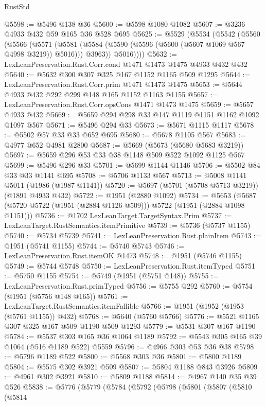\begin{lexlean}{RustStd}
\begin{coremodule}
@5598 := @5496 @138 @36
@5600 := @5598 @1080 @1082
@5607 := @3236 @4933 @432 @59 @165 @36 @528 @695
@5625 := @5529
    (@5534
      (@5542
        (@5560
          (@5566
            (@5571
              (@5581 (@5584 (@5590 (@5596 (@5600 (@5607 @1069 @567 @4998 @3219)) @5016))) @3963))
            @5016))))
@5632 := LexLeanPreservation.Rust.Corr.cond @1471 @1473 @1475 @4933 @432 @432
@5640 := @5632 @300 @307 @325 @167 @1152 @1165 @509 @1295
@5644 := LexLeanPreservation.Rust.Corr.prim @1471 @1473 @1475
@5653 := @5644 @4933 @432 @292 @299 @148 @165 @1152 @1163 @1155
@5657 := LexLeanPreservation.Rust.Corr.opsCons @1471 @1473 @1475
@5659 := @5657 @4933 @432
@5669 := @5659 @294 @298 @33 @147 @1119 @1151 @1162 @1092 @1097 @567
@5671 := @5496 @294 @33
@5673 := @5671 @1115 @1117
@5678 := @5502 @57 @33 @33 @652 @695
@5680 := @5678 @1105 @567
@5683 := @4977 @652 @4981 @2800
@5687 := @5669 (@5673 (@5680 @5683 @3219))
@5697 := @5659 @296 @53 @33 @38 @1148 @509 @522 @1092 @1125 @567
@5699 := @5496 @296 @33
@5701 := @5699 @1144 @1146
@5706 := @5502 @84 @33 @33 @1141 @695
@5708 := @5706 @1133 @567
@5713 := @5008 @1141 @5011 (@1986 (@1987 @1141))
@5720 := @5697 (@5701 (@5708 @5713 @3219)) (@1891 @4933 @432)
@5722 := @1951 (@2880 @1092)
@5734 := @5653 (@5687 (@5720 @5722 (@1951 (@2884 @1126 @509))) @5722 (@1951 (@2884 @1098 @1151)))
@5736 := @1702 LexLeanTarget.TargetSyntax.Prim
@5737 := LexLeanTarget.RustSemantics.itemPrimitive
@5739 := @5736 (@5737 @1155)
@5740 := @5734 @5739
@5741 := LexLeanPreservation.Rust.plainItem
@5743 := @1951 (@5741 @1155)
@5744 := @5740 @5743
@5746 := LexLeanPreservation.Rust.itemOK @1473
@5748 := @1951 (@5746 @1155)
@5749 := @5744 @5748
@5750 := LexLeanPreservation.Rust.itemTyped
@5751 := @5750 @1155
@5754 := @5749 (@1951 (@5751 @148))
@5755 := LexLeanPreservation.Rust.primTyped
@5756 := @5755 @292
@5760 := @5754 (@1951 (@5756 @148 @165))
@5761 := LexLeanTarget.RustSemantics.itemFallible
@5766 := @1951 (@1952 (@1953 (@5761 @1155)) @432)
@5768 := @5640 (@5760 @5766)
@5776 := @5521 @1165 @307 @325 @167 @509 @1190 @509 @1293
@5779 := @5531 @307 @167 @1190
@5784 := @5537 @303 @165 @36 @1064 @1189
@5792 := @5543 @305 @165 @39 @1064 (@516 @1189 @522) @5559
@5796 := @4966 @303 @53 @36 @38
@5798 := @5796 @1189 @522
@5800 := @5568 @303 @36
@5801 := @5800 @1189
@5804 := @5575 @302 @3921 @509
@5807 := @5804 @1188 @843 @3926
@5809 := @4961 @302 @3921
@5810 := @5809 @1188
@5814 := @4967 @140 @35 @39 @526
@5838 := @5776
    (@5779
      (@5784
        (@5792
          (@5798
            (@5801
              (@5807
                (@5810
                  (@5814

\end{coremodule}
\end{lexlean}
